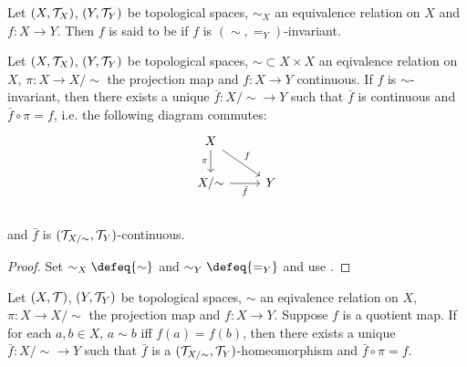 \documentclass{book}
\begin{document}
	\begin{defn}  
		Let $(X, \mathcal{T}_X)$, $(Y, \mathcal{T}_Y)$ be topological spaces, $\sim_X$ an equivalence relation on $X$ and $f : X \rightarrow Y $. Then $f$ is said to be  if $f$ is $(\sim, =_Y)$-invariant.
	\end{defn}

	\begin{ex} 
		Let $(X, \mathcal{T}_X)$, $(Y, \mathcal{T}_Y)$ be topological spaces, ${\sim} \subset X \times X$ an eqivalence relation on $X$, $\pi:X \rightarrow X/ {\sim}$ the projection map and $f:X \rightarrow Y$ continuous. If $f$ is $\sim$-invariant, then there exists a unique $\bar{f}:X / {\sim} \rightarrow Y$ such that $\bar{f}$ is continuous and $\bar{f} \circ \pi = f$, i.e. the following diagram commutes:
		\[ 
		\begin{tikzcd}
			X  \arrow[dr, "f"]  \arrow[d, "\pi"']  & \\
			X/ {\sim} \arrow[r, "\bar{f}"'] &  Y  \\
		\end{tikzcd}
		\]
		and $\bar{f}$ is $(\mathcal{T}_{X/ \sim}, \mathcal{T}_Y)$-continuous.
	\end{ex}

	\begin{proof}
		Set $\sim_X \defeq {\sim}$ and $\sim_Y \defeq {=_Y}$ and use .
	\end{proof}

	\begin{ex} 
		Let $(X, \mathcal{T})$, $(Y, \mathcal{T}_Y)$ be topological spaces, $\sim$ an eqivalence relation on $X$, $\pi:X \rightarrow X/\sim$ the projection map and $f:X \rightarrow Y$. Suppose $f$ is a quotient map. If for each $a, b \in X$, $a \sim b$ iff $f(a) = f(b)$, then there exists a unique $\bar{f}: X/{\sim} \rightarrow Y$ such that $\bar{f}$ is a  $(\mathcal{T}_{X/{\sim}}, \mathcal{T}_Y)$-homeomorphism and $\bar{f} \circ \pi = f$.
	\end{ex}
	
\end{document}
